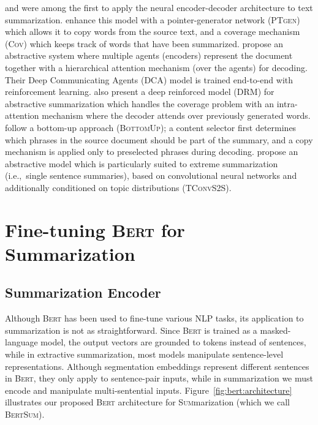\documentclass[11pt,a4paper]{article}
\begin{document}
    
    
    \citet{rush2015neural} and \citet{nallapati2016abstractive} were among
    the first to apply the neural encoder-decoder architecture to text
    summarization.  \citet{see-acl17} enhance this model with a
    pointer-generator network (\textsc{PTgen}) which allows it to copy words
    from the source text, and a coverage mechanism (\textsc{Cov}) which
    keeps track of words that have been summarized.  
    \citet{celikyilmaz2018deep} propose an abstractive system where
    multiple agents (encoders) represent the document together with a
    hierarchical attention mechanism (over the agents) for decoding.
    Their Deep Communicating Agents (\textsc{DCA}) model is trained
    end-to-end with reinforcement learning. \citet{paulus2017deep} also
    present a deep reinforced model (\textsc{DRM}) for abstractive
    summarization which handles the coverage problem with an
    intra-attention mechanism where the decoder attends over previously
    generated words. \citet{gehrmann2018bottom} follow a bottom-up
    approach (\textsc{BottomUp}); a content selector first determines
    which phrases in the source document should be part of the summary, and
    a copy mechanism is applied only to preselected phrases during
    decoding.  \citet{xsum} propose an abstractive model which is
    particularly suited to extreme summarization (i.e.,~single sentence
    summaries), based on convolutional neural networks and additionally
    conditioned on topic distributions (\textsc{TConvS2S}).
    




    
    \section{Fine-tuning \textsc{Bert} for Summarization}
    \label{sec:fine-tuning-textscb}
    
    \subsection{Summarization Encoder}
    \label{sec:summ-encod}
    
    Although \textsc{Bert} has been used to fine-tune various NLP tasks,
    its application to summarization is not as straightforward.  Since
    \textsc{Bert} is trained as a masked-language model, the output
    vectors are grounded to tokens instead of sentences, while in
    extractive summarization, most models manipulate sentence-level
    representations.  Although segmentation embeddings represent different
    sentences in \textsc{Bert}, they only apply to sentence-pair inputs,
    while in summarization we must encode and manipulate multi-sentential
    inputs.  Figure~\ref{fig:bert:architecture} illustrates our proposed
    \textsc{Bert} architecture for \textsc{Sum}marization (which we call
    \textsc{BertSum}).
    
\end{document}
